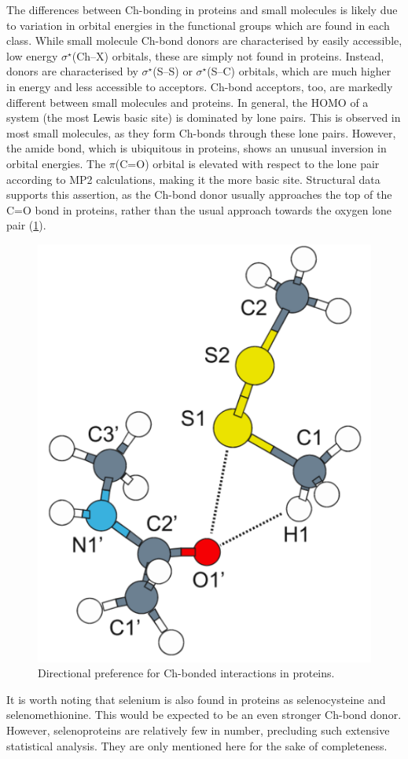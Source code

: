 \begin{refsection}
The differences between Ch-bonding in proteins and small molecules is likely due to variation in orbital energies in the functional groups which are found in each class.
While small molecule Ch-bond donors are characterised by easily accessible, low energy $\sigma^{\star}$(Ch--X) orbitals, these are simply not found in proteins.
Instead, donors are characterised by $\sigma^{\star}$(S--S) or $\sigma^{\star}$(S--C) orbitals, which are much higher in energy and less accessible to acceptors.
Ch-bond acceptors, too, are markedly different between small molecules and proteins.
In general, the HOMO of a system (the most Lewis basic site) is dominated by lone pairs.
This is observed in most small molecules, as they form Ch-bonds through these lone pairs.
However, the amide bond, which is ubiquitous in proteins, shows an unusual inversion in orbital energies.
The $\pi$(C=O) orbital is elevated with respect to the lone pair according to MP2 calculations, making it the more basic site.
Structural data supports this assertion, as the Ch-bond donor usually approaches the top of the C=O bond in proteins, rather than the usual approach towards the oxygen lone pair (\cref{fig:amide-diselenide-ch-bond}).\autocite{Iwaoka2012}

\begin{figure}
    \centering
    \includegraphics[width=0.4\linewidth]{Figures/amide-diselenide-ch-bond.pdf}
    \caption{Directional preference for Ch-bonded interactions in proteins.}
    \label{fig:amide-diselenide-ch-bond}
\end{figure}

It is worth noting that selenium is also found in proteins as selenocysteine and selenomethionine.
This would be expected to be an even stronger Ch-bond donor.
However, selenoproteins are relatively few in number, precluding such extensive statistical analysis.\autocite{Iwaoka2015}
They are only mentioned here for the sake of completeness.


\end{refsection}
